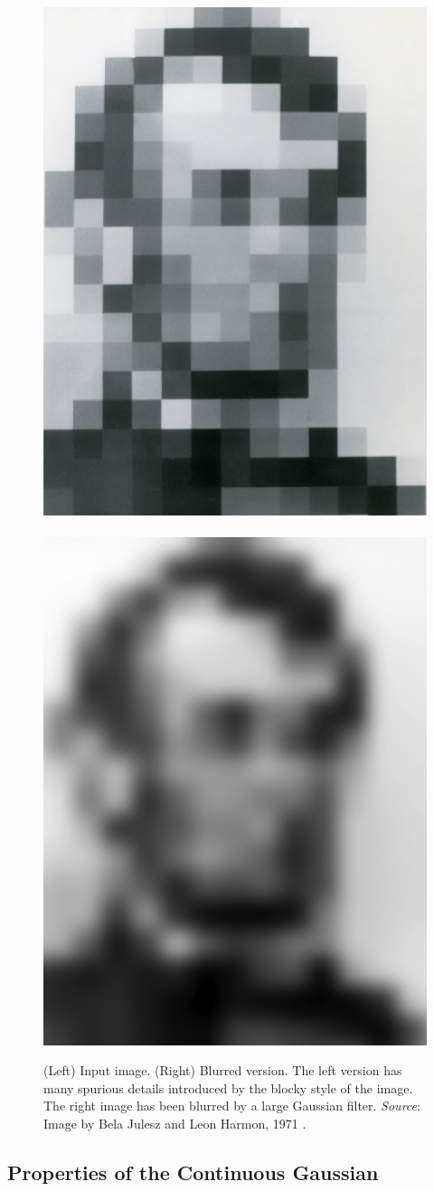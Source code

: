 \begin{figure}[t]
	\centerline{
		\includegraphics[width=.35\linewidth]{figures/blur_filters/Jules_Lincoln_1971.jpg}
		~~
		\includegraphics[width=.35\linewidth]{figures/blur_filters/Jules_Lincoln_1971_blur.jpg}
	}
	\caption{(Left)  Input image.  (Right)  Blurred version.  The left
		version has many spurious details introduced by the blocky style of
		the image.  The right image has been blurred by a large Gaussian
		filter.
			{\em Source}: Image by Bela Julesz and Leon Harmon, 1971 \cite{Harmon_1973}.
	}
	\label{fig:lincoln}
\end{figure}

\subsection{Properties of the Continuous Gaussian}

